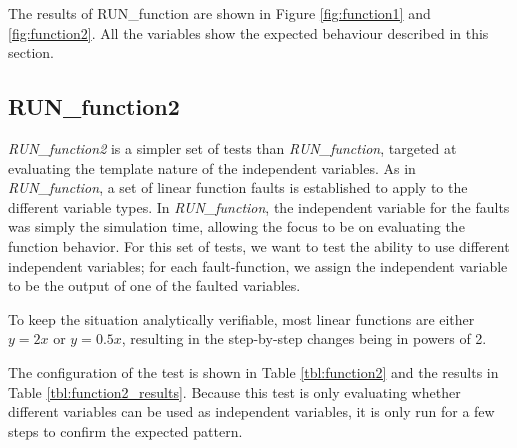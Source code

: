 \documentclass[11pt,fleqn]{report}
\begin{document}
The results of RUN\_function are shown in Figure \ref{fig:function1} and
\ref{fig:function2}.
All the variables show the expected behaviour described in this section.

\clearpage

\subsection{RUN\_function2} \label{sec:verif:FM:function2}
\textit{RUN\_function2} is a simpler set of tests than \textit{RUN\_function},
targeted at evaluating the template nature of the independent variables. As in
\textit{RUN\_function}, a set of linear function faults is established to apply
to the different variable types. In \textit{RUN\_function}, the independent
variable for the faults was simply the simulation time, allowing the focus
to be on evaluating the function behavior. For this set of tests, we
want to test the ability to use different independent variables; for each
fault-function, we assign the independent variable to be the output of one of
the faulted variables.

To keep the situation analytically verifiable, most linear functions are either
$y=2x$ or $y=0.5x$, resulting in the step-by-step changes being in powers of 2.

The configuration of the test is shown in Table \ref{tbl:function2} and the
results in Table \ref{tbl:function2_results}. Because this test is only
evaluating whether different variables can be used as independent variables,
it is only run for a few steps to confirm the expected pattern.
\end{document}
